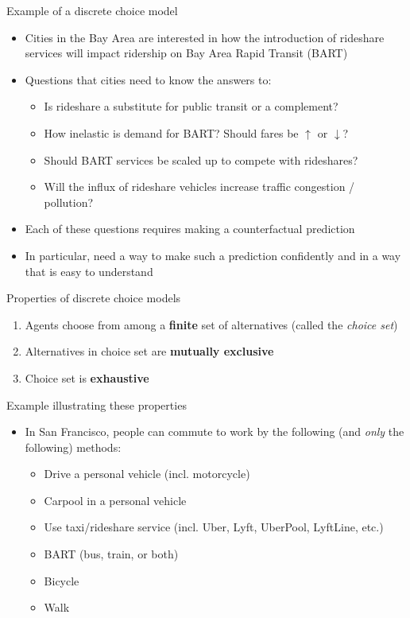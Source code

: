 \documentclass[english,aspectratio=169,12pt,xcolor=dvipsnames]{beamer}
\begin{document}
\begin{frame}{Example of a discrete choice model}
\begin{itemize}
\item Cities in the Bay Area are interested in how the introduction of rideshare services will impact ridership on Bay Area Rapid Transit (BART)
\item Questions that cities need to know the answers to:
    \begin{itemize}
    \item Is rideshare a substitute for public transit or a complement?
    \item How inelastic is demand for BART? Should fares be $\uparrow$ or $\downarrow$?
    \item Should BART services be scaled up to compete with rideshares?
    \item Will the influx of rideshare vehicles increase traffic congestion / pollution?
    \end{itemize}
\item Each of these questions requires making a counterfactual prediction
\item In particular, need a way to make such a prediction confidently and in a way that is easy to understand
\end{itemize}
\end{frame}



\begin{frame}{Properties of discrete choice models}
\begin{enumerate}
\item Agents choose from among a \textbf{finite} set of alternatives (called the \emph{choice set})
\item Alternatives in choice set are \textbf{mutually exclusive}
\item Choice set is \textbf{exhaustive}
\end{enumerate}
\end{frame}



\begin{frame}{Example illustrating these properties}
\begin{itemize}
\item In San Francisco, people can commute to work by the following (and \emph{only} the following) methods:
    \begin{itemize}
    \item Drive a personal vehicle (incl. motorcycle)
    \item Carpool in a personal vehicle
    \item Use taxi/rideshare service (incl. Uber, Lyft, UberPool, LyftLine, etc.)
    \item BART (bus, train, or both)
    \item Bicycle
    \item Walk
    \end{itemize}
\end{itemize}
\end{frame}
\end{document}
